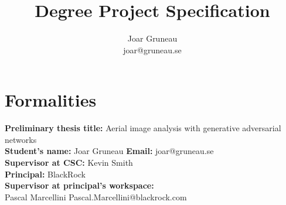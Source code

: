 \documentclass[a4paper,11pt]{article}
\title{Degree Project Specification}
\author{Joar Gruneau \\ joar@gruneau.se}
\affil{}
\begin{document}
\maketitle
\section{Formalities}
\textbf{Preliminary thesis title:} Aerial image analysis with generative adversarial networks\\
\textbf{Student's name:} Joar Gruneau \textbf{Email:} joar@gruneau.se\\
\textbf{Supervisor at CSC:} Kevin Smith\\
\textbf{Principal:} BlackRock\\
\textbf{Supervisor at principal's workspace:}\\
Pascal Marcellini Pascal.Marcellini@blackrock.com
\end{document}
